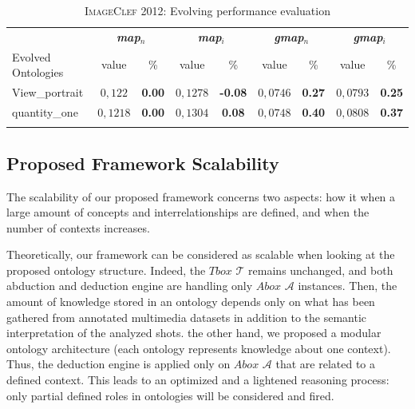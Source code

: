 		
		\begin{table}
			\centering
			\caption{\textsc{ImageClef 2012}: Evolving performance evaluation}
			\begin{footnotesize}
				\begin{tabular}{p{4cm}|cc|cc|cc|cc} 
			
					&\multicolumn{2}{c}{\textbf{\textit{map$_{n}$}}} & 
					\multicolumn{2}{c}{\textbf{\textit{map$_{i}$}}} &
					\multicolumn{2}{c}{\textbf{\textit{gmap$_{n}$}}} & 
					\multicolumn{2}{c}{\textbf{\textit{gmap$_{i}$}}}  \\
					Evolved Ontologies& value & \% & value & \% & value  & \% & value & \% \\
					\hline  
				
			View\_portrait
			& $0,122$ & \textbf{0.00} & $0,1278$ & \textbf{-0.08} & $0,0746$ & \textbf{0.27} & $0,0793$ & \textbf{0.25} \\
			quantity\_one 
			& $0,1218$ & \textbf{0.00} & $0,1304$ & \textbf{0.08} & $0,0748$ & \textbf{0.40} & $0,0808$ & \textbf{0.37} \\
			\hline 	
			\label{ff}
			\end{tabular}
			\end{footnotesize}
		\end{table}
		

		
	\subsection{Proposed Framework Scalability}
		The scalability of our proposed framework concerns two aspects: how 
		it  when a large amount of concepts and interrelationships are defined, 
		and when the number of contexts increases. 

		Theoretically, our framework can be considered as scalable when looking at 
		the proposed ontology structure. Indeed, the $Tbox$ $\mathcal{T}$ remains unchanged, 
		and both abduction and deduction engine are handling only $Abox$ $\mathcal{A}$ instances. 
		Then, the amount of knowledge stored in an ontology depends only on what has been 
		gathered from annotated multimedia datasets in addition to the semantic interpretation 
		of the analyzed shots.  the other hand, we proposed a modular ontology architecture 
		(each ontology represents knowledge about one context). 
		Thus, the deduction engine is applied only on $Abox$ $\mathcal{A}$ that 
		are related to a defined context. This leads to an optimized and 
		a lightened reasoning process: only partial defined roles in ontologies will be considered and fired.

